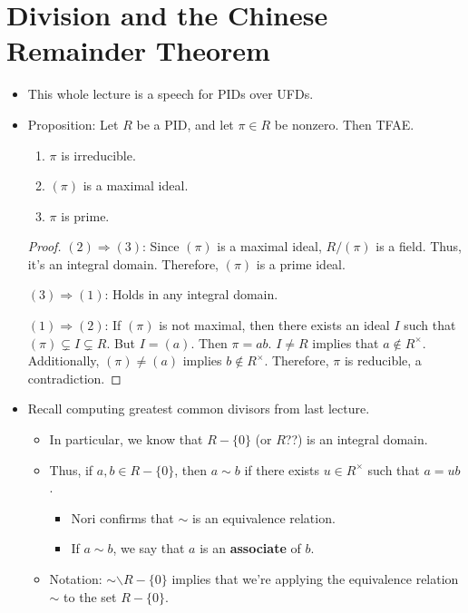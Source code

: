 \documentclass[../notes.tex]{subfiles}
\begin{document}
\section{Division and the Chinese Remainder Theorem}
\begin{itemize}
    \item {}This whole lecture is a speech for PIDs over UFDs.
    \item Proposition: Let $R$ be a PID, and let $\pi\in R$ be nonzero. Then TFAE.
    \begin{enumerate}[label={(\arabic*)}]
        \item $\pi$ is irreducible.
        \item $(\pi)$ is a maximal ideal.
        \item $\pi$ is prime.
    \end{enumerate}
    \begin{proof}
        \underline{$(2)\Longrightarrow(3)$}: Since $(\pi)$ is a maximal ideal, $R/(\pi)$ is a field. Thus, it's an integral domain. Therefore, $(\pi)$ is a prime ideal.\par
        \underline{$(3)\Longrightarrow(1)$}: Holds in any integral domain.\par
        \underline{$(1)\Longrightarrow(2)$}: If $(\pi)$ is not maximal, then there exists an ideal $I$ such that $(\pi)\subsetneq I\subsetneq R$. But $I=(a)$. Then $\pi=ab$. $I\neq R$ implies that $a\notin R^\times$. Additionally, $(\pi)\neq(a)$ implies $b\notin R^\times$. Therefore, $\pi$ is reducible, a contradiction.
    \end{proof}
    \item Recall computing greatest common divisors from last lecture.
    \begin{itemize}
        \item In particular, we know that $R-\{0\}$ (or $R$??) is an integral domain.
        \item Thus, if $a,b\in R-\{0\}$, then $a\sim b$ if there exists $u\in R^\times$ such that $a=ub$.
        \begin{itemize}
            \item Nori confirms that $\sim$ is an equivalence relation.
            \item If $a\sim b$, we say that $a$ is an \textbf{associate} of $b$.
        \end{itemize}
        \item Notation: $\sim\backslash R-\{0\}$ implies that we're applying the equivalence relation $\sim$ to the set $R-\{0\}$.

\end{itemize}
\end{itemize}
\end{document}
